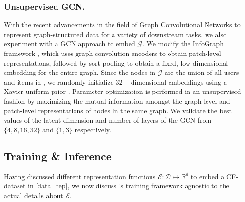 \subsubsection{Unsupervised GCN. \ \ } With the recent advancements in the field of Graph Convolutional Networks \cite{original_gcn} to represent graph-structured data for a variety of downstream tasks, we also experiment with a GCN approach to embed $\mathcal{G}$. We modify the InfoGraph framework \cite{infograph}, which uses graph convolution encoders to obtain patch-level representations, followed by sort-pooling \cite{sort_pooling} to obtain a fixed, low-dimensional embedding for the entire graph. Since the nodes in $\mathcal{G}$ are the union of all users and items in \dataset, we randomly initialize $32-$dimensional embeddings using a Xavier-uniform prior \cite{xavier}. Parameter optimization is performed in an unsupervised fashion by maximizing the mutual information \cite{mutual_information} amongst the graph-level and patch-level representations of nodes in the same graph. We validate the best values of the latent dimension and number of layers of the GCN from $\{ 4, 8, 16, 32 \}$ and $\{ 1, 3 \}$ respectively.

\subsection{Training \& Inference} \label{oracle_architecture}
Having discussed different representation functions $\mathcal{E} : \mathcal{D} \mapsto \mathbb{R}^d$ to embed a CF-dataset in \cref{data_rep}, we now discuss \oracle's training framework agnostic to the actual details about $\mathcal{E}$. 

